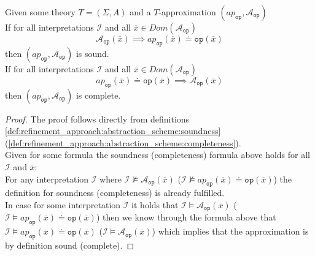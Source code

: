 \begin{lemma}
    \label{lemma:refinement_approach:abstraction_scheme:implication}
    Given some theory $T=\left(\Sigma,A\right)$ and a $T$-approximation $\left(ap_{\texttt{op}}, \mathcal{A}_{\texttt{op}}\right)$\\
    If for all interpretations $\mathcal{I}$ and all $\overline{x}\in Dom\left(\mathcal{A}_{\texttt{op}}\right)$
    \[
        \mathcal{A}_{\texttt{op}}\left(\overline{x}\right) \implies ap_{\texttt{op}}\left(\overline{x}\right) \doteq \texttt{op}\left(\overline{x}\right)
    \]
    then $\left(ap_{\texttt{op}}, \mathcal{A}_{\texttt{op}}\right)$ is sound.\\
    If for all interpretations $\mathcal{I}$ and all $\overline{x}\in Dom\left(\mathcal{A}_{\texttt{op}}\right)$
    \[
        ap_{\texttt{op}}\left(\overline{x}\right) \doteq \texttt{op}\left(\overline{x}\right) \implies \mathcal{A}_{\texttt{op}}\left(\overline{x}\right)
    \]
    then $\left(ap_{\texttt{op}}, \mathcal{A}_{\texttt{op}}\right)$ is complete.
    \begin{proof}
        The proof follows directly from definitions \ref{def:refinement_approach:abstraction_scheme:soundness} (\ref{def:refinement_approach:abstraction_scheme:completeness}).\\
        Given for some formula the soundness (completeness) formula above holds for all $\mathcal{I}$ and $\overline{x}$:\\
        For any interpretation $\mathcal{I}$ where
            $\mathcal{I}\nvDash\mathcal{A}_{\texttt{op}}\left(\overline{x}\right)$
            ($\mathcal{I}\nvDash ap_{\texttt{op}}\left(\overline{x}\right) \doteq \texttt{op}\left(\overline{x}\right)$)
            the definition for soundness (completeness) is already fulfilled.\\
        In case for some interpretation $\mathcal{I}$ it holds that 
            $\mathcal{I}\vDash\mathcal{A}_{\texttt{op}}\left(\overline{x}\right)$
            ($\mathcal{I}\vDash ap_{\texttt{op}}\left(\overline{x}\right) \doteq \texttt{op}\left(\overline{x}\right)$)
        then we know through the formula above that
            $\mathcal{I}\vDash ap_{\texttt{op}}\left(\overline{x}\right) \doteq \texttt{op}\left(\overline{x}\right)$
            ($\mathcal{I}\vDash\mathcal{A}_{\texttt{op}}\left(\overline{x}\right)$)
        which implies that the approximation is by definition sound (complete).


    \end{proof}
\end{lemma}

